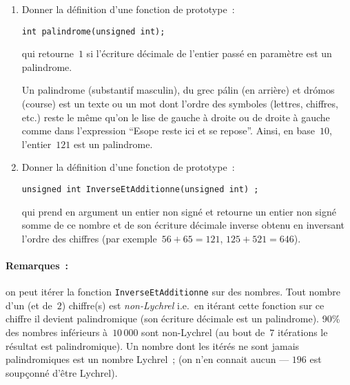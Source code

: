 \begin{enumerate}
\item Donner la d\'efinition d'une fonction de prototype~:
\begin{verbatim}
int palindrome(unsigned int);
\end{verbatim}
qui retourne~$1$ si l'\'ecriture d\'ecimale de l'entier pass\'e en param\`etre est un palindrome.
\par\medskip
Un palindrome (substantif masculin), du grec \textgreek{p\'alin}  (en arri{\`e}re) et \textgreek{dr\'omos} (course) est un texte ou un mot dont l'ordre des symboles (lettres, chiffres, etc.) reste le m{\^e}me qu'on le lise de gauche {\`a} droite ou de droite {\`a} gauche comme dans l'expression ``Esope reste ici et se repose''. Ainsi, en base~$10$, l'entier~$121$ est un palindrome.
\item Donner la d\'efinition d'une fonction de prototype~:
\begin{verbatim}
unsigned int InverseEtAdditionne(unsigned int) ;
\end{verbatim}
qui prend en argument un entier non sign\'e et retourne un entier non sign\'e somme de ce nombre et de son \'ecriture d\'ecimale inverse obtenu en inversant l'ordre des chiffres (par exemple~${56 + 65 = 121}$, ${125 + 521 = 646}$).
\end{enumerate}
\paragraph{Remarques~:} on peut it\'erer la fonction \verb+InverseEtAdditionne+ sur des nombres.
Tout nombre d'un (et de~$2$) chiffre(s) est \emph{non-Lychrel} i.e.~en it\'erant cette fonction sur ce chiffre il devient palindromique (son \'ecriture d\'ecimale est un palindrome). 90\% des nombres inf\'erieurs \`a~$10\, 000$ sont non-Lychrel (au bout de~$7$ it\'erations le r\'esultat est palindromique). Un nombre dont les it\'er\'es ne sont jamais palindromiques est un nombre Lychrel~; (on n'en connait aucun --- $196$ est soup\c{c}onn\'e d'\^etre Lychrel).


